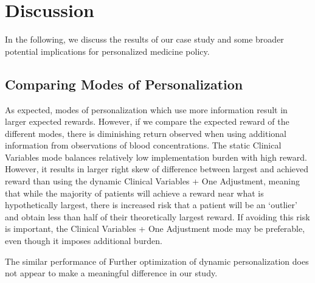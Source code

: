 \section{Discussion}\label{ss:discussion}


In the following, we discuss the results of our case study and some broader potential implications for personalized medicine policy.

\subsection{Comparing Modes of Personalization}

As expected, modes of personalization which use more information result in larger expected rewards.  However, if we compare the expected reward of the different modes, there is diminishing return observed when using additional information from observations of blood concentrations. The static Clinical Variables mode balances relatively low implementation burden with high reward. However, it results in larger right skew of difference between largest and achieved reward than using the dynamic Clinical Variables + One Adjustment, meaning that while the majority of patients will achieve a reward near what is hypothetically largest, there is increased risk that a patient will be an `outlier' and obtain less than half of their theoretically largest reward.  If avoiding this risk is important, the Clinical Variables + One Adjustment mode may be preferable, even though it imposes additional burden. 


The similar performance of Further optimization of dynamic personalization does not appear to make a meaningful difference in our study. 

